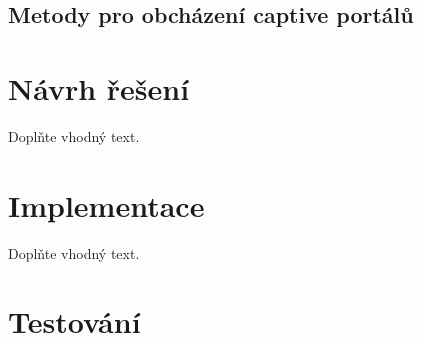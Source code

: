 \documentclass[thesis=M,czech]{FITthesis}[2012/10/20]
\begin{document}


\section{Metody pro obcházení captive portálů}

%








\chapter{Návrh řešení}

Doplňte vhodný text.

\chapter{Implementace}

Doplňte vhodný text.

\chapter{Testování}
\end{document}
